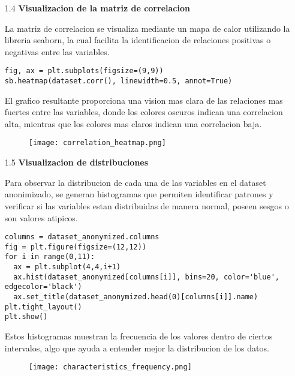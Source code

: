 \documentclass{article}
\begin{document}
\newpage

\begin{itemize}

\item[1.4]  {\bf Visualizacion de la matriz de correlacion}

La matriz de correlacion se visualiza mediante un mapa de calor utilizando la libreria seaborn, la cual facilita la identificacion de relaciones positivas o negativas entre las variables.

\begin{tcolorbox}[width=14cm]
\begin{scriptsize}
\begin{verbatim}
fig, ax = plt.subplots(figsize=(9,9))
sb.heatmap(dataset.corr(), linewidth=0.5, annot=True)
\end{verbatim}
\end{scriptsize}
\end{tcolorbox}

El grafico resultante proporciona una vision mas clara de las relaciones mas fuertes entre las variables, donde los colores oscuros indican una correlacion alta, mientras que los colores mas claros indican una correlacion baja.

\begin{figure}[h]
  \centering
  \texttt{[image: correlation\_heatmap.png]}
\end{figure}

\end{itemize}

\newpage

\begin{itemize}

\item[1.5]  {\bf Visualizacion de distribuciones}

Para observar la distribucion de cada una de las variables en el dataset anonimizado, se generan histogramas que permiten identificar patrones y verificar si las variables estan distribuidas de manera normal, poseen sesgos o son valores atipicos.

\begin{tcolorbox}[width=14cm]
\begin{scriptsize}
\begin{verbatim}
columns = dataset_anonymized.columns
fig = plt.figure(figsize=(12,12))
for i in range(0,11):
  ax = plt.subplot(4,4,i+1)
  ax.hist(dataset_anonymized[columns[i]], bins=20, color='blue', edgecolor='black')
  ax.set_title(dataset_anonymized.head(0)[columns[i]].name)
plt.tight_layout()
plt.show()
\end{verbatim}
\end{scriptsize}
\end{tcolorbox}

Estos histogramas muestran la frecuencia de los valores dentro de ciertos intervalos, algo que ayuda a entender mejor la distribucion de los datos.

\begin{figure}[h]
  \centering
  \texttt{[image: characteristics\_frequency.png]}
\end{figure}

\end{itemize}
\end{document}
